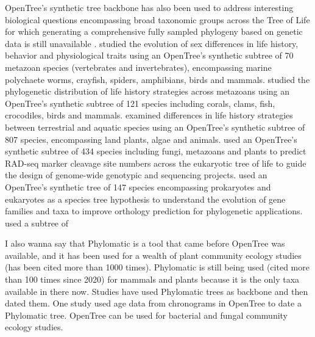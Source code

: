 \documentclass[oupdraft]{sysbio_sse}
\begin{document}
OpenTree's synthetic tree backbone has also been used to address interesting biological
questions encompassing broad taxonomic groups across the Tree of Life for which generating a
comprehensive fully sampled phylogeny based on genetic data is still unavailable
\citep{tarka2018sex, healy2019animal, herrera2015predicting, capdevila2020longevity}.
\citep{tarka2018sex} studied the evolution of sex differences in life history, behavior
and physiological traits using an OpenTree's synthetic subtree of 70 metazoan species (vertebrates and invertebrates),
encompassing marine polychaete worms, crayfish, spiders, amphibians, birds and mammals.
\citep{healy2019animal} studied the phylogenetic distribution of life history strategies across metazoans
using an OpenTree's synthetic subtree of 121 species including corals, clams,
fish, crocodiles, birds and mammals.
\citep{capdevila2020longevity} examined differences in life history strategies between
terrestrial and aquatic species using an OpenTree's synthetic subtree of 807 species,
encompassing land plants, algae and animals.
\citep{herrera2015predicting} used an OpenTree's synthetic subtree of 434 species
including fungi, metazoans and plants to predict RAD-seq marker cleavage site numbers
across the eukaryotic tree of life to guide the design of genome-wide genotypic and
sequencing projects.
\citep{boeckmann2015quest} used an OpenTree's synthetic tree of 147 species encompassing
prokaryotes and eukaryotes as a species tree hypothesis to understand the evolution
of gene families and taxa to improve orthology prediction for phylogenetic applications.
\citep{uyeda2017evolution} used a subtree of








I also wanna say that Phylomatic \citep{webb2005phylomatic} is a tool that came before
OpenTree was available, and it has been used for a wealth of plant community ecology
studies (has been cited more than 1000 times).
Phylomatic is still being used (cited more than 100 times since 2020) for mammals
and plants because it is the only taxa available in there now.
Studies have used Phylomatic trees as backbone and then dated them. One study used
age data from chronograms in OpenTree to date a Phylomatic tree.
OpenTree can be used for bacterial and fungal community ecology studies.
\end{document}
